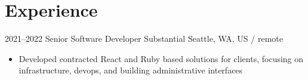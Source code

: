 \documentclass[11pt,a4paper,sans]{moderncv}
\begin{document}
  \pagebreak

  \section{Experience}
  \cventry
    {2021--2022}
    {Senior Software Developer}
    {Substantial}
    {Seattle, WA, US / remote}
    {}
    {
      \begin{itemize}
        \item Developed contracted React and Ruby based solutions for clients, focusing on infrastructure, devops, and building administrative interfaces
      \end{itemize}
    }
\end{document}
